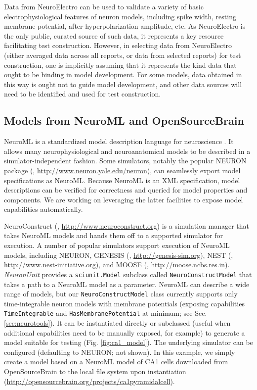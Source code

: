 \documentclass{frontiersSCNS}
\let\verbx\lstinline
\begin{document}
Data from NeuroElectro can be used to validate a variety of basic electrophysiological features of neuron models, including spike width, resting membrane potential, after-hyperpolarization amplitude, etc. 
As NeuroElectro is the only public, curated source of such data, it represents a key resource facilitating test construction.  
However, in selecting data from NeuroElectro (either averaged data across all reports, or data from selected reports) for test construction, one is implicitly assuming that it represents the kind data that ought to be binding in model development.  
For some models, data obtained in this way is ought not to guide model development, and other data sources will need to be identified and used for test construction.  

\subsection{Models from NeuroML and OpenSourceBrain}\label{sec:neuroml_models}
NeuroML is a standardized model description language for neuroscience \citep{gleeson_neuroml:_2010}. 
It allows many neurophysiological and neuroanatomical models to be described in a simulator-independent fashion. Some simulators, notably the popular NEURON package (\cite{carnevale_neuron_2006}, \url{http://www.neuron.yale.edu/neuron}), can seamlessly export model specifications as NeuroML. 
Because NeuroML is an XML specification, model descriptions can be verified for correctness and queried for model properties and components. We are working on leveraging the latter facilities to expose model capabilities automatically. %

NeuroConstruct (\cite{gleeson_neuroconstruct:_2007}, \url{http://www.neuroconstruct.org}) is a simulation manager that takes NeuroML models and hands them off to a supported simulator for execution. A number of popular simulators support execution of NeuroML models, including NEURON, GENESIS (\cite{bower_genesis_2007}, \url{http://genesis-sim.org}), NEST (\cite{gewaltig_nest_2007}, \url{http://www.nest-initiative.org}), and MOOSE (\cite{ray_moose_2008}, \url{http://moose.ncbs.res.in}). 
\textit{NeuronUnit} provides a \verbx{sciunit.Model} subclass called \verbx{NeuroConstructModel} that takes a path to a NeuroML model as a parameter.  
NeuroML can describe a wide range of models, but our \verbx{NeuroConstructModel} class currently supports only time-integrable neuron models with membrane potentials (exposing capabilities \verbx{TimeIntegrable} and \verbx{HasMembranePotential} at minimum; see Sec. \ref{sec:neurotools}). 
It can be instantiated directly or subclassed (useful when additional capabilities need to be manually exposed, for example) to generate a model suitable for testing (Fig. \ref{fig:ca1_model}). The underlying simulator can be configured (defaulting to NEURON; not shown). In this example, we simply create a model based on a NeuroML model of CA1 cells \cite{migliore_ca1_2005} downloaded from OpenSourceBrain to the local file system upon instantiation (\url{http://opensourcebrain.org/projects/ca1pyramidalcell}).
\end{document}
